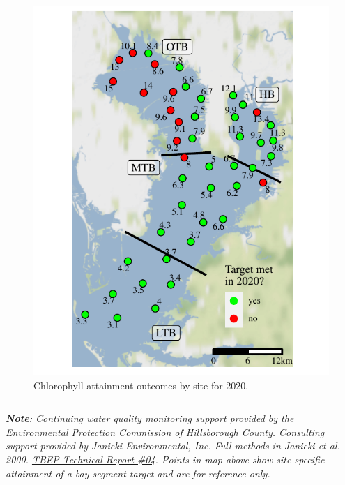 \documentclass[final,t]{beamer}\usepackage[]{graphicx}\usepackage[]{color}
\begin{document}
\begin{frame}
\begin{columns}[t]
\begin{column}{.79\linewidth}
\begin{columns}[t]
\begin{column}{0.37\textwidth}
\begin{figure}
\centerline{\includegraphics[trim = 0cm 0cm 0cm -1.25cm, width=1.1\linewidth]{figure/sitemap.pdf}}
\caption{\footnotesize Chlorophyll attainment outcomes by site for 2020.}
\label{fig:sitemap}
\end{figure}

\end{column}

\end{columns}

\vspace{-0.4cm}

\tiny \textit{\textbf{Note}: Continuing water quality monitoring support provided by the Environmental Protection Commission of Hillsborough County.  Consulting support provided by Janicki Environmental, Inc.  Full methods in Janicki et al. 2000. \href{https://www.tbeptech.org/TBEP_TECH_PUBS/2000/TBEP_04_00Chlor-A.pdf}{TBEP Technical Report \#04}. Points in map above show site-specific attainment of a bay segment target and are for reference only.} \\

\end{column}

\end{columns}

\end{frame}
\end{document}
